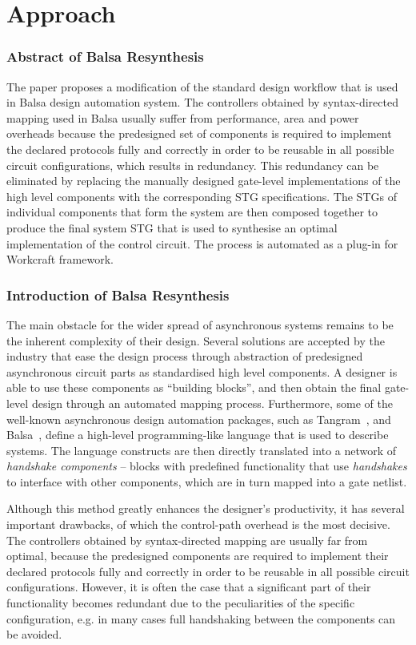 \chapter{Approach}

\subsection{Abstract of Balsa Resynthesis}

The paper proposes a modification of the standard design workflow
that is used in Balsa design automation system. The controllers obtained
by syntax-directed mapping used in Balsa usually suffer from performance,
area and power overheads because the predesigned set of components
is required to implement the declared protocols fully and correctly
in order to be reusable in all possible circuit configurations, which
results in redundancy. This redundancy can be eliminated by replacing
the manually designed gate-level implementations of the high level
components with the corresponding STG specifications. The STGs of
individual components that form the system are then composed together
to produce the final system STG that is used to synthesise an optimal
implementation of the control circuit. The process is automated as
a plug-in for Workcraft framework.

\subsection{Introduction of Balsa Resynthesis\label{sec:Balsa-Introduction}}

The main obstacle for the wider spread of asynchronous systems remains
to be the inherent complexity of their design. Several solutions are
accepted by the industry that ease the design process through abstraction
of predesigned asynchronous circuit parts as standardised high level
components. A designer is able to use these components as ``building
blocks'', and then obtain the final gate-level design through an
automated mapping process. Furthermore, some of the well-known asynchronous
design automation packages, such as Tangram~\cite{951597}, and Balsa~\cite{balsa},
define a high-level programming-like language that is used to describe
systems. The language constructs are then directly translated into
a network of \emph{handshake components }-- blocks with predefined
functionality that use \emph{handshakes} to interface with other components,
which are in turn mapped into a gate netlist. 

Although this method greatly enhances the designer's productivity,
it has several important drawbacks, of which the control-path overhead
is the most decisive. The controllers obtained by syntax-directed
mapping are usually far from optimal, because the predesigned components
are required to implement their declared protocols fully and correctly
in order to be reusable in all possible circuit configurations. However,
it is often the case that a significant part of their functionality
becomes redundant due to the peculiarities of the specific configuration,
e.g. in many cases full handshaking between the components can be
avoided.

